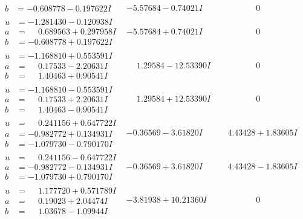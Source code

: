 \documentclass[1p]{elsarticle_modified}
\theoremstyle{definition}
\begin{document}
$$\begin{array}{c|c|c}
\begin{aligned}
b &= -0.608778 - 0.197622 I\end{aligned}
 & -5.57684 - 0.74021 I & \phantom{-0.000000 } 0 \\ \hline\begin{aligned}
u &= -1.281430 - 0.120938 I \\
a &= \phantom{-}0.689563 + 0.297958 I \\
b &= -0.608778 + 0.197622 I\end{aligned}
 & -5.57684 + 0.74021 I & \phantom{-0.000000 } 0 \\ \hline\begin{aligned}
u &= -1.168810 + 0.553591 I \\
a &= \phantom{-}0.17533 - 2.20631 I \\
b &= \phantom{-}1.40463 + 0.90541 I\end{aligned}
 & \phantom{-}1.29584 - 12.53390 I & \phantom{-0.000000 } 0 \\ \hline\begin{aligned}
u &= -1.168810 - 0.553591 I \\
a &= \phantom{-}0.17533 + 2.20631 I \\
b &= \phantom{-}1.40463 - 0.90541 I\end{aligned}
 & \phantom{-}1.29584 + 12.53390 I & \phantom{-0.000000 } 0 \\ \hline\begin{aligned}
u &= \phantom{-}0.241156 + 0.647722 I \\
a &= -0.982772 + 0.134931 I \\
b &= -1.079730 - 0.790170 I\end{aligned}
 & -0.36569 - 3.61820 I & \phantom{-}4.43428 + 1.83605 I \\ \hline\begin{aligned}
u &= \phantom{-}0.241156 - 0.647722 I \\
a &= -0.982772 - 0.134931 I \\
b &= -1.079730 + 0.790170 I\end{aligned}
 & -0.36569 + 3.61820 I & \phantom{-}4.43428 - 1.83605 I \\ \hline\begin{aligned}
u &= \phantom{-}1.177720 + 0.571789 I \\
a &= \phantom{-}0.19023 + 2.04474 I \\
b &= \phantom{-}1.03678 - 1.09944 I\end{aligned}
 & -3.81938 + 10.21360 I & \phantom{-0.000000 } 0 \\ \hline\begin{aligned}

\end{aligned}
\end{array}$$
\end{document}
